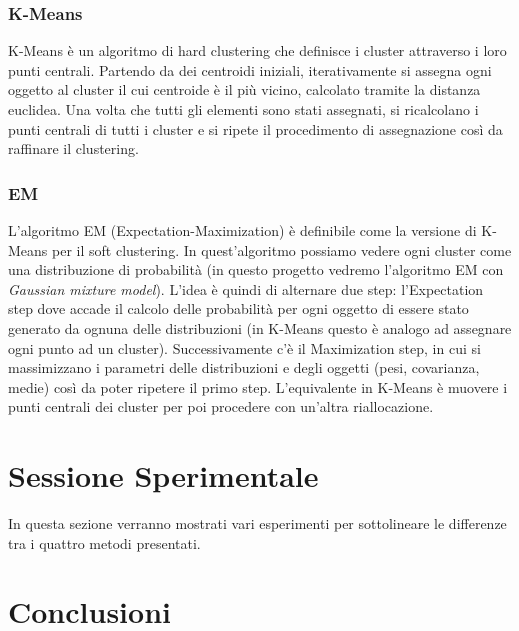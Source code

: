 \documentclass{llncs}
\begin{document}
	\subsubsection{K-Means}
	K-Means è un algoritmo di hard clustering che definisce i cluster attraverso i loro punti centrali.
	Partendo da dei centroidi iniziali, iterativamente si assegna ogni oggetto al cluster il cui centroide è
	il più vicino, calcolato tramite la distanza euclidea. Una volta che tutti gli elementi sono stati assegnati, si ricalcolano i punti centrali di tutti
	i cluster e si ripete il procedimento di assegnazione così da raffinare il clustering.

	\subsubsection{EM}
	L'algoritmo EM (Expectation-Maximization) è definibile come la versione di K-Means per il soft clustering.
	In quest'algoritmo possiamo vedere ogni cluster come una distribuzione di probabilità (in questo progetto vedremo l'algoritmo EM con \textit{Gaussian mixture model}).
	L'idea è quindi di alternare due step: l'Expectation step dove accade il calcolo delle probabilità per ogni oggetto di essere stato generato da ognuna delle distribuzioni 
	(in K-Means questo è analogo ad assegnare ogni punto ad un cluster). 
	Successivamente c'è il Maximization step, in cui si massimizzano i parametri delle distribuzioni e degli oggetti (pesi, covarianza, medie) così da poter ripetere il primo step. 
	L'equivalente in K-Means è muovere i punti centrali dei cluster per poi procedere con un'altra riallocazione.


	\section{Sessione Sperimentale}
	In questa sezione verranno mostrati vari esperimenti per sottolineare le differenze tra i quattro metodi presentati.
    \section{Conclusioni}
    
\end{document}
